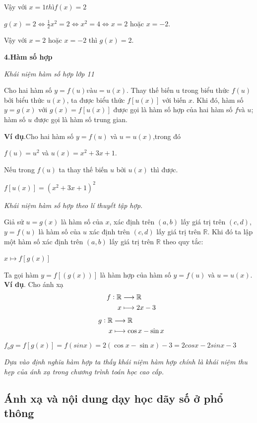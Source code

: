 \documentclass[12pt,oneside,a4paper,reqno]{book}
\begin{document}
Vậy với $x=1 thì f(x)=2$

$g(x)=2 \Leftrightarrow \frac{1}{2} x^2=2 \Leftrightarrow x^2=4 \Leftrightarrow x=2$ hoặc $x=-2.$ 

Vậy với $x=2$ hoặc $x=-2$ thì $g(x)=2$.

{\bf 4.Hàm số hợp}

\textit{Khái niệm hàm số hợp lớp 11}

Cho hai hàm số $y=f(u)và u=u(x).$ Thay thế biến u trong biểu thức $f(u)$ bởi biểu thức $u(x)$, ta được biểu thức $f[u(x)]$     với biến $x$. Khi đó, hàm số $y=g(x)$ với $g(x)=f[u(x)]$ được gọi là hàm số hợp của hai hàm số $f $và $u$; hàm số $u$     được gọi là hàm số trung gian.

{\bf Ví dụ}.Cho hai hàm số $y=f(u)$  và $u=u(x)$,trong đó

           $f(u)=u^2$  và $u(x)=x^2+3x+1.$
           
Nếu trong $f(u)$ ta thay thế biến $u$ bởi $u(x)$ thì được.
\begin{center}
$f[u(x) ]=(x^2+3x+1)^2$
\end{center}
\textit{Khái niệm hàm số hợp theo lí thuyết tập hợp.}

Giả sử $u=g(x)$ là hàm số của $x$, xác định trên $\left(a,b\right)$ lấy giá trị trên $\left(c,d\right)$, $y=f(u)$ là hàm số của $u$ xác định trên $\left(c,d\right)$ lấy giá trị trên $\mathbb{R}$. Khi đó ta lập một hàm số xác định trên $\left(a,b\right)$ lấy giá trị trên $\mathbb{R}$ theo quy tắc:

 \begin{center}
$x \longmapsto f\left[ {g(x)} \right]$
\end{center}
Ta gọi hàm $y=f[(g(x))]$ là hàm hợp của hàm số $y=f(u)$ và $u=u(x)$.\\
{\bf Ví dụ}. Cho ánh xạ
\begin{align*}
\text{ \space}f:\mathbb{R}&\longrightarrow\mathbb{R}\\
x&\longmapsto 2x-3
\end{align*}
\begin{align*}
\text{ \space}g:\mathbb{R}&\longrightarrow\mathbb{R}\\
x&\longmapsto \cos x-\sin x
\end{align*}
$f_{o}g=f\left[g(x)\right]=f\left(sinx\right)=2(\cos x-\sin x)-3=2cosx-2sinx-3$

\textit{Dựa vào định nghĩa hàm hợp ta thấy khái niệm hàm hợp chính là khái niệm thu hẹp của ánh xạ trong chương trình toán học cao cấp.}
\subsection{Ánh xạ và nội dung dạy học dãy số ở phổ thông}
\end{document}
